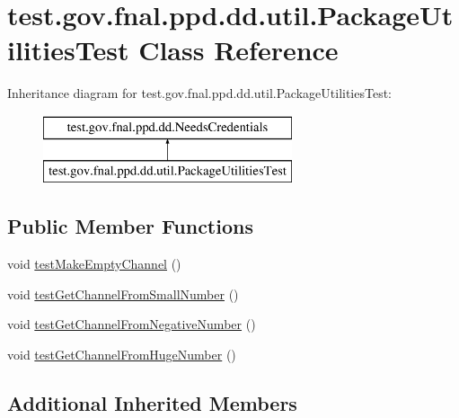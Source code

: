 \hypertarget{classtest_1_1gov_1_1fnal_1_1ppd_1_1dd_1_1util_1_1PackageUtilitiesTest}{\section{test.\-gov.\-fnal.\-ppd.\-dd.\-util.\-Package\-Utilities\-Test Class Reference}
\label{classtest_1_1gov_1_1fnal_1_1ppd_1_1dd_1_1util_1_1PackageUtilitiesTest}
}
Inheritance diagram for test.\-gov.\-fnal.\-ppd.\-dd.\-util.\-Package\-Utilities\-Test\-:\begin{figure}[H]
\begin{center}
\leavevmode
\includegraphics[height=2.000000cm]{classtest_1_1gov_1_1fnal_1_1ppd_1_1dd_1_1util_1_1PackageUtilitiesTest}
\end{center}
\end{figure}
\subsection*{Public Member Functions}
\begin{DoxyCompactItemize}
\item 
void \hyperlink{classtest_1_1gov_1_1fnal_1_1ppd_1_1dd_1_1util_1_1PackageUtilitiesTest_a755280fe3851f23490b80ec8936b12a2}{test\-Make\-Empty\-Channel} ()
\item 
void \hyperlink{classtest_1_1gov_1_1fnal_1_1ppd_1_1dd_1_1util_1_1PackageUtilitiesTest_aa3d66045fdebf7b9eef0171386f312e9}{test\-Get\-Channel\-From\-Small\-Number} ()
\item 
void \hyperlink{classtest_1_1gov_1_1fnal_1_1ppd_1_1dd_1_1util_1_1PackageUtilitiesTest_a70e14161583dd037412d976ee5051106}{test\-Get\-Channel\-From\-Negative\-Number} ()
\item 
void \hyperlink{classtest_1_1gov_1_1fnal_1_1ppd_1_1dd_1_1util_1_1PackageUtilitiesTest_a3b735176b1ea2e34db01434033776b21}{test\-Get\-Channel\-From\-Huge\-Number} ()
\end{DoxyCompactItemize}
\subsection*{Additional Inherited Members}


